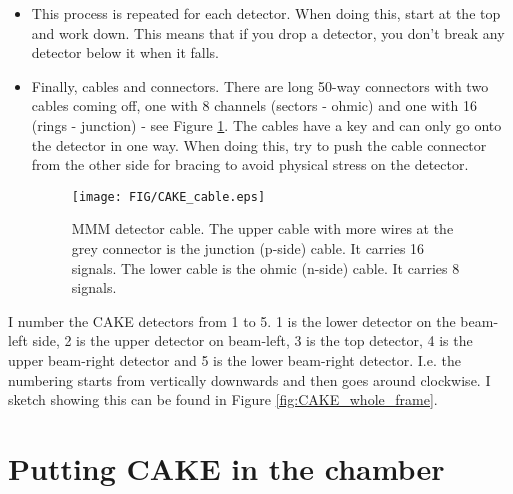 \documentclass[11pt]{report}
\begin{document}
\begin{itemize}
\item This process is repeated for each detector. When doing this, start at the top and work down. This means that if you drop a detector, you don’t break any detector below it when it falls.

\item Finally, cables and connectors. There are long 50-way connectors with two cables coming off, one with 8 channels (sectors - ohmic) and one with 16 (rings - junction) - see Figure \ref{fig:CAKE_cables}. The cables have a key and can only go onto the detector in one way. When doing this, try to push the cable connector from the other side for bracing to avoid physical stress on the detector.

\begin{figure}
 \texttt{[image: FIG/CAKE\_cable.eps]}
 \caption{MMM detector cable. The upper cable with more wires at the grey connector is the junction (p-side) cable. It carries 16 signals. The lower cable is the ohmic (n-side) cable. It carries 8 signals.}
 \label{fig:CAKE_cables}
\end{figure}


\end{itemize}

I number the CAKE detectors from 1 to 5. 1 is the lower detector on the beam-left side, 2 is the upper detector on beam-left, 3 is the top detector, 4 is the upper beam-right detector and 5 is the lower beam-right detector. I.e. the numbering starts from vertically downwards and then goes around clockwise. I sketch showing this can be found in Figure \ref{fig:CAKE_whole_frame}.


\section{Putting CAKE in the chamber}
\end{document}
